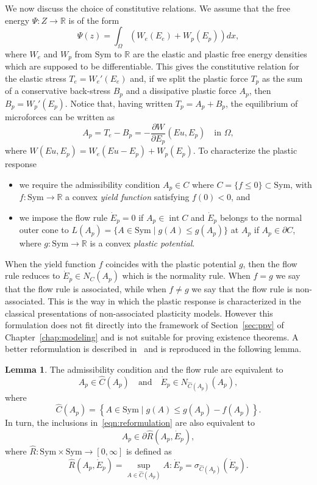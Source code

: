 \documentclass[a4paper,10pt,oneside]{amsbook}
\numberwithin{section}{chapter}
\numberwithin{equation}{chapter}
\theoremstyle{definition}
\newtheorem{lemma}[prop]{Lemma}
\DeclareMathOperator{\inter}{int}
\newcommand{\dind}[2]{\frac{\partial #1}{\partial #2}}
\begin{document}
We now discuss the choice of constitutive relations. We assume that the free energy $\Psi\colon Z\to\mathbb{R}$ is of the form
\[
\Psi(z)=\int_\Omega\left(W_e(E_e)+W_p(E_p)\right)dx,
\]
where $W_e$ and $W_p$ from $\text{Sym}$ to $\mathbb{R}$ are the elastic and plastic free energy densities which are supposed to be differentiable. This gives the constitutive relation for the elastic stress $T_e=W_e'(E_e)$ and, if we split the plastic force $T_p$ as the sum of a conservative back-stress $B_p$ and a dissipative plastic force $A_p$, then $B_p=W_p'(E_p)$. Notice that, having written $T_p=A_p+B_p$, the equilibrium of microforces can be written as
\begin{equation}
\label{eqn:Ap}
A_p=T_e-B_p=-\dind{W}{E_p}(Eu,E_p)\quad\text{in $\Omega$},
\end{equation}
where $W(Eu,E_p)=W_e(Eu-E_p)+W_p(E_p)$. To characterize the plastic response
\begin{itemize}
\item[(i)] we require the admissibility condition $A_p\in C$ where $C=\{f\le0\}\subset\text{Sym}$, with $f\colon\text{Sym}\to\mathbb{R}$ a convex \emph{yield function} satisfying $f(0)<0$, and
\item[(ii)] we impose the flow rule $\dot E_p=0$ if $A_p\in\inter C$ and $\dot E_p$ belongs to the normal outer cone to $L(A_p)=\{A\in\text{Sym}\;|\;g(A)\le g(A_p)\}$ at $A_p$ if $A_p\in\partial C$, where $g\colon\text{Sym}\to\mathbb{R}$ is a convex \emph{plastic potential}.
\end{itemize}
When the yield function $f$ coincides with the plastic potential $g$, then the flow rule reduces to $\dot E_p\in N_C(A_p)$ which is the normality rule. When $f=g$ we say that the flow rule is associated, while when $f\neq g$ we say that the flow rule is non-associated. This is the way in which the plastic response is characterized in the classical presentations of non-associated plasticity models. However this formulation does not fit directly into the framework of Section~\ref{sec:ppv} of Chapter~\ref{chap:modeling} and is not suitable for proving existence theorems. A better reformulation is described in~\cite{Laborde1987,morafrancfort,StefanelliVikelis2024} and is reproduced in the following lemma.
\begin{lemma}
The admissibility condition and the flow rule are equivalent to
\begin{equation}
\label{eqn:reformulation}
A_p\in\hat{C}(A_p)\quad\text{and}\quad\dot E_p\in N_{\hat{C}(A_p)}(A_p),
\end{equation}
where
\[
\hat{C}(A_p)=\left\{A\in\text{Sym}\;|\;g(A)\le g(A_p)-f(A_p)\right\}.
\]
In turn, the inclusions in~\eqref{eqn:reformulation} are also equivalent to
\begin{equation}
\label{eqn:reformulation-2}
A_p\in\partial\hat{R}(A_p,\dot E_p),
\end{equation}
where $\hat{R}\colon\text{Sym}\times\text{Sym}\to[0,\infty]$ is defined as
\begin{equation}
\label{eqn:R-hat}
\hat{R}(A_p,\dot E_p)=\sup_{A\in\hat{C}(A_p)}A:\dot E_p=\sigma_{\hat{C}(A_p)}(\dot E_p).
\end{equation}
\end{lemma}
\end{document}
